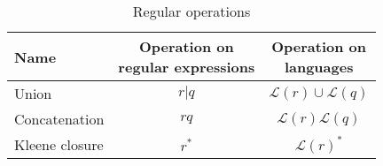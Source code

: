 \begin{table}[t]
\centering

\setlength\extrarowheight{.5em}

\begin{tabular}{l c c}
\toprule
Name & \makecell{Operation on\\regular expressions} & \makecell{Operation on\\languages} \\ \midrule
Union          & \(r|q\) & \quad \(\mathcal{L}(r) \cup \mathcal{L}(q)\) \\
Concatenation  & \(rq\)  & \quad \(\mathcal{L}(r)\mathcal{L}(q)\) \\
Kleene closure & \(r^*\) & \quad \(\mathcal{L}(r)^*\)\\
\bottomrule
\end{tabular}
\caption{Regular operations}
\label{tab:regex-ops}
\end{table}
